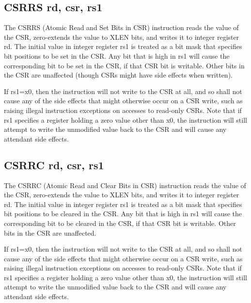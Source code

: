 \subsection{CSRRS rd, csr, rs1}

The CSRRS (Atomic Read and Set Bits in CSR) instruction reads the value 
of the CSR, zero-extends the value to XLEN bits, and writes it to integer 
register rd. The initial value in integer register rs1 is treated as a bit 
mask that specifies bit positions to be set in the CSR. Any bit that
is high in rs1 will cause the corresponding bit to be set in the CSR, 
if that CSR bit is writable.  Other bits in the CSR are unaffected (though 
CSRs might have side effects when written).~\cite[p.~22]{rvismv1v22:2017}

If rs1=x0, then the instruction will not write 
to the CSR at all, and so shall not cause any of the side effects that 
might otherwise occur on a CSR write, such as raising illegal instruction 
exceptions on accesses to read-only CSRs. Note that if rs1 specifies a 
register holding a zero value other than x0, the instruction will still 
attempt to write the unmodified value back to the CSR and will cause any 
attendant side effects.~\cite[p.~22]{rvismv1v22:2017}


\subsection{CSRRC rd, csr, rs1}

The CSRRC (Atomic Read and Clear Bits in CSR) instruction reads the value 
of the CSR, zero-extends the value to XLEN bits, and writes it to integer 
register rd. The initial value in integer register rs1 is treated as a 
bit mask that specifies bit positions to be cleared in the CSR. Any bit
that is high in rs1 will cause the corresponding bit to be cleared in 
the CSR, if that CSR bit is writable. Other bits in the CSR are 
unaffected.~\cite[p.~22]{rvismv1v22:2017}

If rs1=x0, then the instruction will not write 
to the CSR at all, and so shall not cause any of the side effects that 
might otherwise occur on a CSR write, such as raising illegal instruction 
exceptions on accesses to read-only CSRs. Note that if rs1 specifies a 
register holding a zero value other than x0, the instruction will still 
attempt to write the unmodified value back to the CSR and will cause any 
attendant side effects.~\cite[p.~22]{rvismv1v22:2017}

